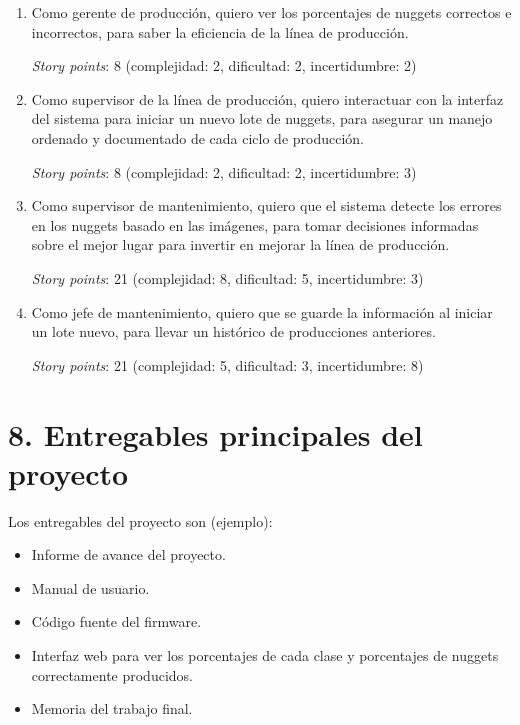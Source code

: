\documentclass[
11pt, %
]{charter}
\begin{document}
\begin{enumerate}
\item Como gerente de producción, quiero ver los porcentajes de nuggets correctos e incorrectos, para saber la eficiencia de la línea de producción.

\textit{Story points}: 8 (complejidad: 2, dificultad: 2, incertidumbre: 2)

\item Como supervisor de la línea de producción, quiero interactuar con la interfaz del sistema para iniciar un nuevo lote de nuggets, para asegurar un manejo ordenado y documentado de cada ciclo de producción.

\textit{Story points}: 8 (complejidad: 2, dificultad: 2, incertidumbre: 3)

\item Como supervisor de mantenimiento, quiero que el sistema detecte los errores en los nuggets basado en las imágenes, para tomar decisiones informadas sobre el mejor lugar para invertir en mejorar la línea de producción.

\textit{Story points}: 21 (complejidad: 8, dificultad: 5, incertidumbre: 3)

\item Como jefe de mantenimiento, quiero que se guarde la información al iniciar un lote nuevo, para llevar un histórico de producciones anteriores.

\textit{Story points}: 21 (complejidad: 5, dificultad: 3, incertidumbre: 8)

\end{enumerate}

\section{8. Entregables principales del proyecto}
\label{sec:entregables}

Los entregables del proyecto son (ejemplo):

\begin{itemize}
	\item Informe de avance del proyecto.
	\item Manual de usuario.
	\item Código fuente del firmware.
	\item Interfaz web para ver los porcentajes de cada clase y porcentajes de nuggets correctamente producidos.
	\item Memoria del trabajo final.
\end{itemize}
\end{document}
